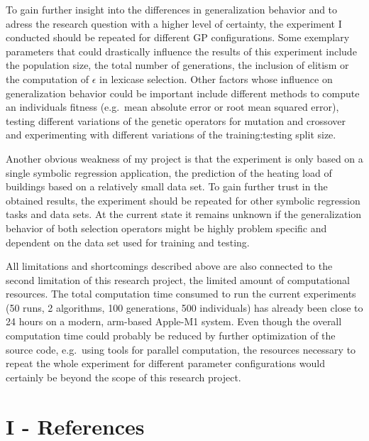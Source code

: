 \documentclass[
  12pt,
]{article}
\begin{document}
To gain further insight into the differences in generalization behavior
and to adress the research question with a higher level of certainty,
the experiment I conducted should be repeated for different GP
configurations. Some exemplary parameters that could drastically
influence the results of this experiment include the population size,
the total number of generations, the inclusion of elitism or the
computation of \(\epsilon\) in lexicase selection. Other factors whose
influence on generalization behavior could be important include
different methods to compute an individuals fitness (e.g.~mean absolute
error or root mean squared error), testing different variations of the
genetic operators for mutation and crossover and experimenting with
different variations of the training:testing split size.

Another obvious weakness of my project is that the experiment is only
based on a single symbolic regression application, the prediction of the
heating load of buildings based on a relatively small data set. To gain
further trust in the obtained results, the experiment should be repeated
for other symbolic regression tasks and data sets. At the current state
it remains unknown if the generalization behavior of both selection
operators might be highly problem specific and dependent on the data set
used for training and testing.

All limitations and shortcomings described above are also connected to
the second limitation of this research project, the limited amount of
computational resources. The total computation time consumed to run the
current experiments (50 runs, 2 algorithms, 100 generations, 500
individuals) has already been close to 24 hours on a modern, arm-based
Apple-M1 system. Even though the overall computation time could probably
be reduced by further optimization of the source code, e.g.~using tools
for parallel computation, the resources necessary to repeat the whole
experiment for different parameter configurations would certainly be
beyond the scope of this research project.

\newpage

\hypertarget{I}{%
\section*{I - References}\label{I}}
\end{document}
